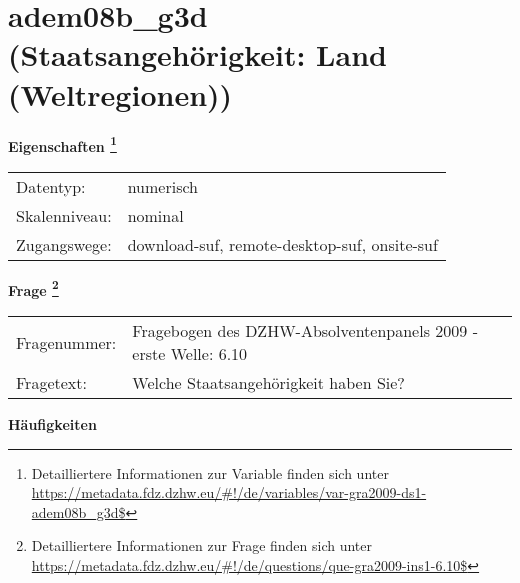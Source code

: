 
    \setcounter{footnote}{0}

    \vspace*{-1.8cm}
	\section{adem08b\_g3d (Staatsangehörigkeit: Land (Weltregionen))}
	\label{section:adem08b_g3d}



    \vspace*{0.5cm}
    \noindent\textbf{Eigenschaften
	\footnote{Detailliertere Informationen zur Variable finden sich unter
		\url{https://metadata.fdz.dzhw.eu/\#!/de/variables/var-gra2009-ds1-adem08b_g3d$}}}\\
	\begin{tabularx}{\hsize}{@{}lX}
	Datentyp: & numerisch \\
	Skalenniveau: & nominal \\
	Zugangswege: &
	  download-suf, 
	  remote-desktop-suf, 
	  onsite-suf
 \\
    \end{tabularx}



				\vspace*{0.5cm}
                \noindent\textbf{Frage
	                \footnote{Detailliertere Informationen zur Frage finden sich unter
		              \url{https://metadata.fdz.dzhw.eu/\#!/de/questions/que-gra2009-ins1-6.10$}}}\\
				\begin{tabularx}{\hsize}{@{}lX}
					Fragenummer: &
					  Fragebogen des DZHW-Absolventenpanels 2009 - erste Welle:
					  6.10
 \\
					Fragetext: & Welche Staatsangehörigkeit haben Sie? \\
				\end{tabularx}





        		\vspace*{0.5cm}
                \noindent\textbf{Häufigkeiten}

